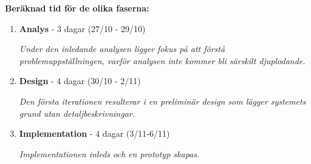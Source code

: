 \documentclass[a4paper]{article}
\begin{document}
    \textbf{Beräknad tid för de olika faserna:}

    \begin{enumerate}
        \item \textbf{Analys} - 3 dagar (27/10 - 29/10)

              \textit{Under den inledande analysen ligger fokus på att förstå
                      problemuppställningen, varför analysen inte kommer bli
                      särskilt djuplodande.}

        \item \textbf{Design} - 4 dagar (30/10 - 2/11)

              \textit{Den första iterationen resulterar i en preliminär design
                      som lägger systemets grund utan detaljbeskrivningar.}

        \item \textbf{Implementation} - 4 dagar (3/11-6/11)

              \textit{Implementationen inleds och en prototyp skapas.}
    \end{enumerate}
\end{document}
